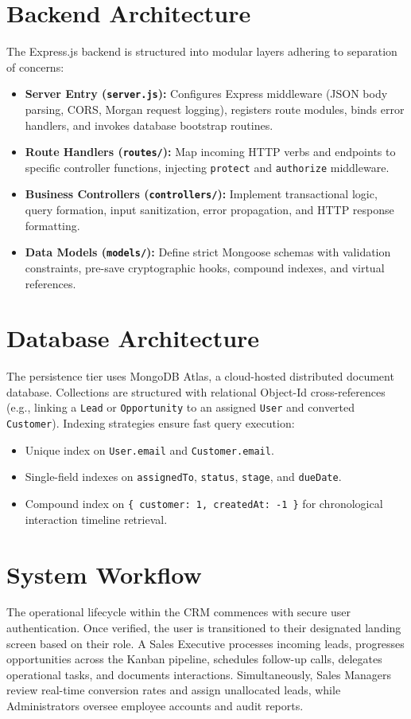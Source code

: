 \section{Backend Architecture}
The Express.js backend is structured into modular layers adhering to separation of concerns:
\begin{itemize}
    \item \textbf{Server Entry (\texttt{server.js}):} Configures Express middleware (JSON body parsing, CORS, Morgan request logging), registers route modules, binds error handlers, and invokes database bootstrap routines.
    \item \textbf{Route Handlers (\texttt{routes/}):} Map incoming HTTP verbs and endpoints to specific controller functions, injecting \texttt{protect} and \texttt{authorize} middleware.
    \item \textbf{Business Controllers (\texttt{controllers/}):} Implement transactional logic, query formation, input sanitization, error propagation, and HTTP response formatting.
    \item \textbf{Data Models (\texttt{models/}):} Define strict Mongoose schemas with validation constraints, pre-save cryptographic hooks, compound indexes, and virtual references.
\end{itemize}

\section{Database Architecture}
The persistence tier uses MongoDB Atlas, a cloud-hosted distributed document database. Collections are structured with relational Object-Id cross-references (e.g., linking a \texttt{Lead} or \texttt{Opportunity} to an assigned \texttt{User} and converted \texttt{Customer}). Indexing strategies ensure fast query execution:
\begin{itemize}
    \item Unique index on \texttt{User.email} and \texttt{Customer.email}.
    \item Single-field indexes on \texttt{assignedTo}, \texttt{status}, \texttt{stage}, and \texttt{dueDate}.
    \item Compound index on \texttt{\{ customer: 1, createdAt: -1 \}} for chronological interaction timeline retrieval.
\end{itemize}

\section{System Workflow}
The operational lifecycle within the CRM commences with secure user authentication. Once verified, the user is transitioned to their designated landing screen based on their role. A Sales Executive processes incoming leads, progresses opportunities across the Kanban pipeline, schedules follow-up calls, delegates operational tasks, and documents interactions. Simultaneously, Sales Managers review real-time conversion rates and assign unallocated leads, while Administrators oversee employee accounts and audit reports.

